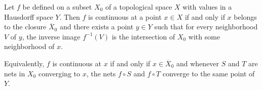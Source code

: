 Let $f$ be defined on a subset $X_0$ of a topological space $X$ with values in a Hausdorff space $Y$. Then $f$ is continuous at a point $x \in X$ if and only if $x$ belongs to the closure $\overline{X}_0$ and there exists a point $y \in Y$ such that for every neighborhood $V$ of $y$, the inverse image $f^{-1}(V)$ is the intersection of $X_0$ with some neighborhood of $x$.

Equivalently, $f$ is continuous at $x$ if and only if $x \in \overline{X}_0$ and whenever $S$ and $T$ are nets in $X_0$ converging to $x$, the nets $f \circ S$ and $f \circ T$ converge to the same point of $Y$.
